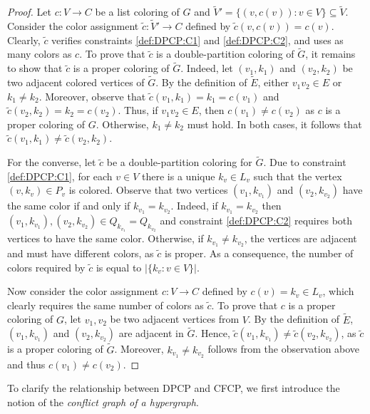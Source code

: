 \documentclass[preprint, 11pt, authoryear]{elsarticle}
\begin{document}
\begin{proof} 
    Let $c: V \longrightarrow C$ be a list coloring of $G$ and  $\tilde V' = \{(v,c(v)) : v \in V\} \subseteq \tilde{V}$. 
    Consider the color assignment $\tilde c: \tilde V' \to C$ defined by $\tilde c(v,c(v)) = c(v)$.
    Clearly, $\tilde c$ verifies constraints \ref{def:DPCP:C1} and \ref{def:DPCP:C2}, and uses as many colors as $c$.
    To prove that $\tilde c$ is a double-partition coloring of $\tilde G$, it remains to show that $\tilde c$ is a 
    proper coloring of $\tilde G$. Indeed, let $(v_1,k_1)$ and $(v_2,k_2)$ be two adjacent colored vertices of $\tilde G$. By the definition of $\tilde E$, either $v_1v_2 \in E$ or $k_1 \neq k_2$. Moreover, observe that $\tilde c(v_1,k_1) = k_1 = c(v_1)$ and $\tilde c(v_2,k_2) = k_2 = c(v_2)$. Thus, if $v_1v_2 \in E$, then $c(v_1) \neq c(v_2)$ as $c$ is a proper coloring of $G$. Otherwise, $k_1 \neq k_2$ must hold.
    In both cases, it follows that $\tilde c (v_1,k_1) \neq \tilde c(v_2,k_2)$.

    For the converse, let $\tilde c$ be a double-partition coloring for $\tilde G$.
    Due to constraint \ref{def:DPCP:C1}, for each $v\in V$ there is a unique $k_v \in L_v$ such that the vertex $(v, k_v) \in P_v$ is colored. 
    Observe that two vertices $(v_1, k_{v_1})$ and $(v_2, k_{v_2})$ have the same color if and only if $k_{v_1} = k_{v_2}$. Indeed, if $k_{v_1} = k_{v_2}$ then $(v_1, k_{v_1}), (v_2, k_{v_2}) \in Q_{k_{v_1}} = Q_{k_{v_2}}$ and constraint \ref{def:DPCP:C2} requires both vertices to have the same color. Otherwise, if $k_{v_1} \neq k_{v_2}$, the vertices are adjacent and must have different colors, as $\tilde c$ is proper. As a consequence, the number of colors required by $\tilde c$ is equal to $|\{k_v : v \in V\}|$.
    
    Now consider the color assignment $ c: V \longrightarrow C$ defined by $c(v)=k_v \in L_v$, which clearly requires the same number of colors as $\tilde c$.
    To prove that $c$ is a proper coloring of $G$, let $v_1,v_2$ be two adjacent vertices from $V$. 
    By the definition of $\tilde E$, $(v_1,k_{v_1})$ and $(v_2,k_{v_2})$ are adjacent in $\tilde G$. 
    Hence, $\tilde c(v_1,k_{v_1})\neq \tilde c(v_2,k_{v_2})$, as $\tilde c$ is a proper coloring of $\tilde G$. 
    Moreover, $k_{v_1} \neq k_{v_2}$ follows from the observation above and thus $c(v_1) \neq c(v_2)$.
\end{proof}


To clarify the relationship between DPCP and CFCP, we first introduce the notion of the \emph{conflict graph of a hypergraph}.
\end{document}

